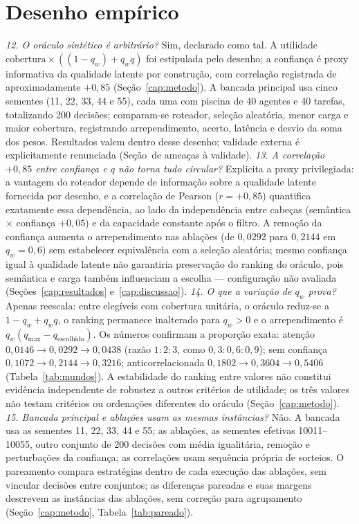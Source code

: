 \section{Desenho empírico}
\textit{12. O oráculo sintético é arbitrário?} Sim, declarado como tal. A utilidade $\mathrm{cobertura}\times((1-q_w)+q_wq)$ foi estipulada pelo desenho; a confiança é proxy informativa da qualidade latente por construção, com correlação registrada de aproximadamente $+0{,}85$ (Seção~\ref{cap:metodo}). A bancada principal usa cinco sementes (11, 22, 33, 44 e 55), cada uma com piscina de 40 agentes e 40 tarefas, totalizando 200 decisões; comparam-se roteador, seleção aleatória, menor carga e maior cobertura, registrando arrependimento, acerto, latência e desvio da soma dos pesos. Resultados valem dentro desse desenho; validade externa é explicitamente renunciada (Seção~de ameaças à validade).
\textit{13. A correlação $+0{,}85$ entre confiança e $q$ não torna tudo circular?} Explicita a proxy privilegiada: a vantagem do roteador depende de informação sobre a qualidade latente fornecida por desenho, e a correlação de Pearson ($r=+0{,}85$) quantifica exatamente essa dependência, ao lado da independência entre cabeças (semântica $\times$ confiança $+0{,}05$) e da capacidade constante após o filtro. A remoção da confiança aumenta o arrependimento nas ablações (de $0{,}0292$ para $0{,}2144$ em $q_w=0{,}6$) sem estabelecer equivalência com a seleção aleatória; mesmo confiança igual à qualidade latente não garantiria preservação do ranking do oráculo, pois semântica e carga também influenciam a escolha --- configuração não avaliada (Seções~\ref{cap:resultados} e~\ref{cap:discussao}).
\textit{14. O que a variação de $q_w$ prova?} Apenas reescala: entre elegíveis com cobertura unitária, o oráculo reduz-se a $1-q_w+q_wq$, o ranking permanece inalterado para $q_w>0$ e o arrependimento é $q_w(q_{\max}-q_{\mathrm{escolhido}})$. Os números confirmam a proporção exata: atenção $0{,}0146\to0{,}0292\to0{,}0438$ (razão $1{:}2{:}3$, como $0{,}3{:}0{,}6{:}0{,}9$); sem confiança $0{,}1072\to0{,}2144\to0{,}3216$; anticorrelacionada $0{,}1802\to0{,}3604\to0{,}5406$ (Tabela~\ref{tab:mundos}). A estabilidade do ranking entre valores não constitui evidência independente de robustez a outros critérios de utilidade; os três valores não testam critérios ou ordenações diferentes do oráculo (Seção~\ref{cap:metodo}).
\textit{15. Bancada principal e ablações usam as mesmas instâncias?} Não. A bancada usa as sementes 11, 22, 33, 44 e 55; as ablações, as sementes efetivas 10011--10055, outro conjunto de 200 decisões com média igualitária, remoção e perturbações da confiança; as correlações usam sequência própria de sorteios. O pareamento compara estratégias dentro de cada execução das ablações, sem vincular decisões entre conjuntos; as diferenças pareadas e suas margens descrevem as instâncias das ablações, sem correção para agrupamento (Seção~\ref{cap:metodo}, Tabela~\ref{tab:pareado}).
